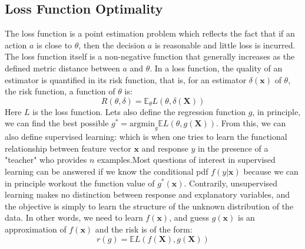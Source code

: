 \documentclass[12pt]{article}
\begin{document}
\subsection{Loss Function Optimality}
The loss function is a point estimation problem which reflects the fact that if an action $a$ is close to $\theta$, then the decision $a$ is reasonable and little loss is incurred. The loss function itself is a non-negative function that generally increases as the defined metric distance between $a$ and $\theta$. In a loss function, the quality of an estimator is quantified in its risk function, that is, for an estimator $\delta(\mathbf{x}) $ of $\theta$, the risk function, a function of $\theta$ is:
\[R(\theta, \delta) = \mathbb{E}_\theta L(\theta, \delta(\mathbf{X}))\]
Here $L$ is the loss function. Lets also define the regression function $g$, in principle, we can find the best possible $g^* = \text{argmin}_g\mathbb{E}L(\theta, g(\mathbf{X}))$. From this, we can also define supervised learning: which is when one tries to learn the functional relationship between feature vector $\mathbf{x}$ and response $y$ in the presence of a "teacher" who provides $n$ examples.Most questions of interest in supervised learning can be answered if we know the conditional pdf $f(y|\mathbf{x})$ because we can in principle workout the function value of $g^*(\mathbf{x})$. Contrarily, unsupervised learning makes no distinction between response and explanatory variables, and the objective is simply to learn the structure of the unknown distribution of the data. In other words, we need to learn $f(\mathbf{x})$, and guess $g(\mathbf{x})$ is an approximation of $f(\mathbf{x})$ and the risk is of the form:
\[r(g) = \mathbb{E}L(f(\mathbf{X}), g(\mathbf{X}))\]
\end{document}
